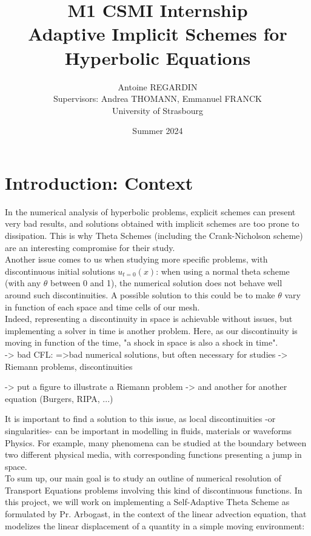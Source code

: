 \documentclass[12pt]{article}
\begin{document}
\def\spacingset#1{\renewcommand{\baselinestretch}%
{#1}\small\normalsize} \spacingset{1}

\title{\bf M1 CSMI Internship\\ Adaptive Implicit Schemes for Hyperbolic Equations}
\author{Antoine REGARDIN\hspace{.2cm}\\
    Supervisors: Andrea THOMANN, Emmanuel FRANCK\\
    University of Strasbourg\\ }
\date{Summer 2024}
\maketitle

\tableofcontents

\newpage

\section{Introduction: Context}
In the numerical analysis of hyperbolic problems, explicit schemes can present very bad results, and solutions obtained with implicit schemes
are too prone to dissipation. This is why Theta Schemes (including the Crank-Nicholson scheme) are an interesting compromise for their study.\\
Another issue comes to us when studying more specific problems, with discontinuous initial solutions $u_{t=0}(x)$: when using a normal theta scheme (with any $\theta$ between 0 and 1),
the numerical solution does not behave well around such discontinuities. A possible solution to this could be to make $\theta$ vary in function of each space and time cells of our mesh.\\
Indeed, representing a discontinuity in space is achievable without issues, but implementing a solver in time is another problem.
Here, as our discontinuity is moving in function of the time, "a shock in space is also a shock in time".\\
-> bad CFL: =>bad numerical solutions, but often necessary for studies
-> Riemann problems, discontinuities


-> put a figure to illustrate a Riemann problem
-> and another for another equation (Burgers, RIPA, ...)


It is important to find a solution to this issue, as local discontinuities -or singularities- can be important in modelling in fluids, materials or waveforms Physics.
For example, many phenomena can be studied at the boundary between two different physical media,
with corresponding functions presenting a jump in space.\\
To sum up, our main goal is to study an outline of numerical resolution of Transport Equations problems
involving this kind of discontinuous functions. In this project, we will work on implementing a Self-Adaptive Theta Scheme as formulated by Pr. Arbogast, 
in the context of the linear advection equation, that modelizes the linear displacement of a quantity in a simple moving environment:
\end{document}
